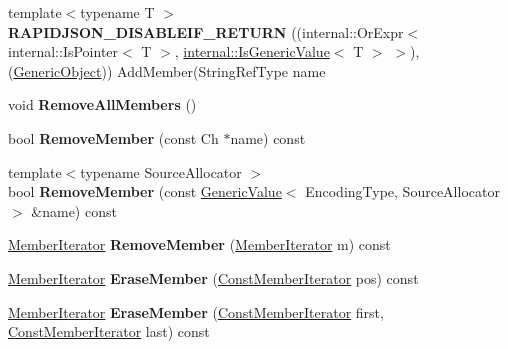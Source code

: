 \begin{DoxyCompactItemize}
\item 
{\footnotesize template$<$typename T $>$ }\\{\bfseries R\+A\+P\+I\+D\+J\+S\+O\+N\+\_\+\+D\+I\+S\+A\+B\+L\+E\+I\+F\+\_\+\+R\+E\+T\+U\+RN} ((internal\+::\+Or\+Expr$<$ internal\+::\+Is\+Pointer$<$ T $>$, \hyperlink{structinternal_1_1_is_generic_value}{internal\+::\+Is\+Generic\+Value}$<$ T $>$ $>$),(\hyperlink{class_generic_object}{Generic\+Object})) Add\+Member(String\+Ref\+Type name\hypertarget{class_generic_object_af361a4b677882964789201fc605541d0}{}\label{class_generic_object_af361a4b677882964789201fc605541d0}

\item 
void {\bfseries Remove\+All\+Members} ()\hypertarget{class_generic_object_a129ce3843a6658e620a7f740d9f44ee1}{}\label{class_generic_object_a129ce3843a6658e620a7f740d9f44ee1}

\item 
bool {\bfseries Remove\+Member} (const Ch $\ast$name) const \hypertarget{class_generic_object_a64bfcf1671efa5de04cc7659a014a29d}{}\label{class_generic_object_a64bfcf1671efa5de04cc7659a014a29d}

\item 
{\footnotesize template$<$typename Source\+Allocator $>$ }\\bool {\bfseries Remove\+Member} (const \hyperlink{class_generic_value}{Generic\+Value}$<$ Encoding\+Type, Source\+Allocator $>$ \&name) const \hypertarget{class_generic_object_acca9953e3c2e6df16d7685572ac3fe9d}{}\label{class_generic_object_acca9953e3c2e6df16d7685572ac3fe9d}

\item 
\hyperlink{class_generic_member_iterator}{Member\+Iterator} {\bfseries Remove\+Member} (\hyperlink{class_generic_member_iterator}{Member\+Iterator} m) const \hypertarget{class_generic_object_a2489d8522f3c38324df69f6184cd639a}{}\label{class_generic_object_a2489d8522f3c38324df69f6184cd639a}

\item 
\hyperlink{class_generic_member_iterator}{Member\+Iterator} {\bfseries Erase\+Member} (\hyperlink{class_generic_member_iterator}{Const\+Member\+Iterator} pos) const \hypertarget{class_generic_object_a85ed6e1f586c775a02aaa99d0deabcb4}{}\label{class_generic_object_a85ed6e1f586c775a02aaa99d0deabcb4}

\item 
\hyperlink{class_generic_member_iterator}{Member\+Iterator} {\bfseries Erase\+Member} (\hyperlink{class_generic_member_iterator}{Const\+Member\+Iterator} first, \hyperlink{class_generic_member_iterator}{Const\+Member\+Iterator} last) const \hypertarget{class_generic_object_a04c3ce4a9076ab2f7e8f6c5031456c29}{}\label{class_generic_object_a04c3ce4a9076ab2f7e8f6c5031456c29}


\end{DoxyCompactItemize}
